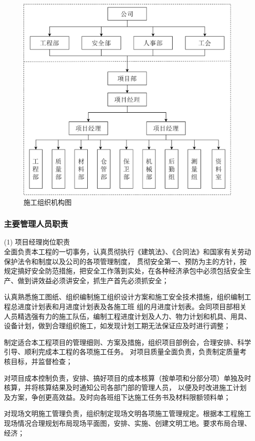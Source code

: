 \begin{figure}[thbp!]
    \centering
    \includegraphics[width=0.7\linewidth]{figure/c2f1.png}
    \caption{施工组织机构图}
    \label{fig:c2f1}
\end{figure}

\subsubsection{主要管理人员职责}

(1) 项目经理岗位职责\\

 全面负责本工程的一切事务，认真贯彻执行《建筑法》、《合同法》和国家有关劳动保护法令和制度以及公司的各项管理制度，
贯彻安全第一、预防为主的方针，按规定搞好安全防范措施，把安全工作落到实处，在各种经济承包中必须包括安全生产、做到讲效益必须讲安全，抓生产首先必须抓安全；

 认真熟悉施工图纸、组织编制施工组织设计方案和施工安全技术措施，组织编制工程总进度计划表和月进度计划表及各施工班
组的月进度计划表。会同项目部相关人员精选强有力的施工队伍，编制工程进度计划及人力、物力计划和机具、用具、设备计划，做到合理组织施工，如发现计划工期无法保证应及时进行调整；

 制定适合本工程项目的管理细则、方案及措施，组织项目部例会，合理安排、科学引导、顺利完成本工程的各项施工任务。
对项目质量全面负责，负责制定质量考核目标，并监督检查；

 对项目成本控制负责，安排、搞好项目的成本核算（按单项和分部分项）单独及时核算，并将核算结果及时通知公司各部门部的管理人员，
以便及时改进施工计划及方案，争创更高效益。及时向各班组下达施工任务书及材料限额领料单；

 对现场文明施工管理负责，组织制定现场文明各项施工管理规定。根据本工程施工现场情况合理规划布局现场平面图，安排、实施、创建文明工地。要求布局合理、经济；

